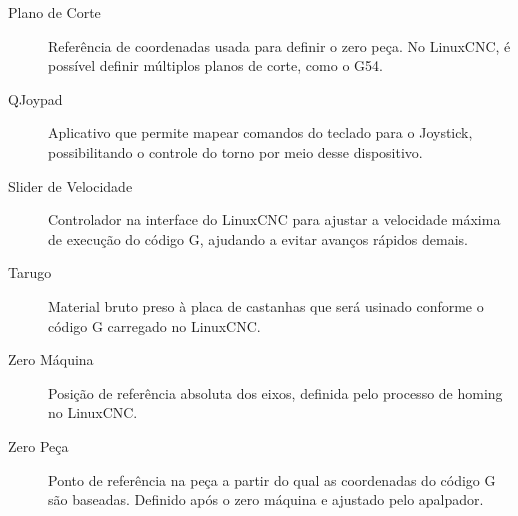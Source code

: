 \documentclass[twoside,a4paper]{refart}
\begin{document}
\begin{description}
	\item[Plano de Corte] Referência de coordenadas usada para definir o zero peça. No LinuxCNC, é possível definir múltiplos planos de corte, como o G54.
	
	\item[QJoypad] Aplicativo que permite mapear comandos do teclado para o Joystick, possibilitando o controle do torno por meio desse dispositivo.
	
	\item[Slider de Velocidade] Controlador na interface do LinuxCNC para ajustar a velocidade máxima de execução do código G, ajudando a evitar avanços rápidos demais.
	
	\item[Tarugo] Material bruto preso à placa de castanhas que será usinado conforme o código G carregado no LinuxCNC.
	
	\item[Zero Máquina] Posição de referência absoluta dos eixos, definida pelo processo de homing no LinuxCNC.
	
	\item[Zero Peça] Ponto de referência na peça a partir do qual as coordenadas do código G são baseadas. Definido após o zero máquina e ajustado pelo apalpador.
\end{description}
\end{document}
